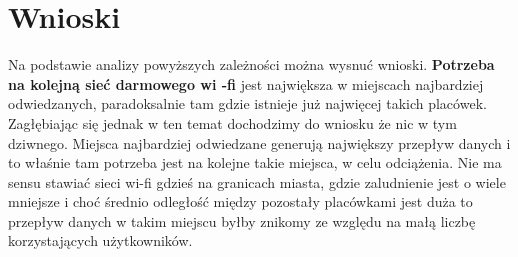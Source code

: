 \documentclass[10pt]{article}
\begin{document}
\section{Wnioski}
Na podstawie analizy powyższych zależności można wysnuć wnioski. 
\newline \textbf{Potrzeba na kolejną sieć darmowego wi -fi } jest największa w miejscach najbardziej odwiedzanych, paradoksalnie tam gdzie istnieje już najwięcej takich placówek. Zagłębiając się jednak w ten temat dochodzimy do wniosku że nic w tym dziwnego. Miejsca najbardziej odwiedzane generują największy przepływ danych i to właśnie tam potrzeba jest na kolejne takie miejsca, w celu odciążenia. Nie ma sensu stawiać sieci wi-fi gdzieś na granicach miasta, gdzie zaludnienie jest o wiele mniejsze i choć średnio odległość między pozostały placówkami jest duża to przepływ danych w takim miejscu byłby znikomy ze względu na małą liczbę korzystających użytkowników.
\end{document}
